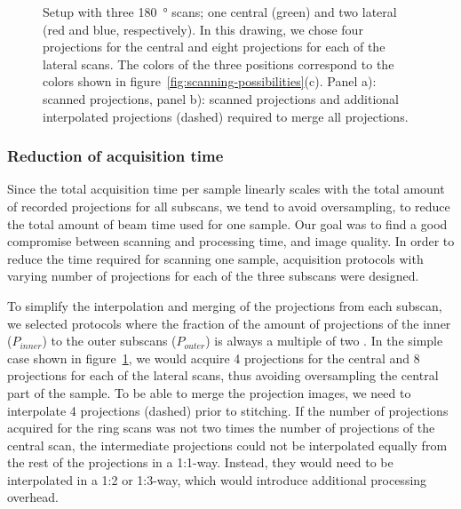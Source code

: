 \ifiucr
	\begin{figure}%
		\caption{Setup with three \SI{180}{\degree} scans; one central (green) and two lateral (red and blue, respectively). In this drawing, we chose four projections for the central and eight projections for each of the lateral scans. The colors of the three positions correspond to the colors shown in figure~\ref{fig:scanning-possibilities}(c). Panel a): scanned projections, panel b): scanned projections and additional interpolated projections (dashed) required to merge all projections.}%
		\label{fig:projections}%
	\end{figure}%
\else
	\begin{figure*}[htp]
		\centering
		\caption{Setup with three \SI{180}{\degree} scans; one central (green) and two lateral (red and blue, respectively). In this drawing, we chose four projections for the central and eight projections for each of the lateral scans. The colors of the three positions correspond to the colors shown in figure~\ref{fig:scanning-possibilities}(c). Panel a): scanned projections, panel b): scanned projections and additional interpolated projections (dashed) required to merge all projections.}%
		\label{fig:projections}
	\end{figure*}
\fi

\subsubsection{Reduction of acquisition time}\label{subsubsec:reduction-of-acquisition-time}%
Since the total acquisition time per sample linearly scales with the total amount of recorded projections for all subscans, we tend to avoid oversampling, to reduce the total amount of beam time used for one sample. Our goal was to find a good compromise between scanning and processing time, and image quality. In order to reduce the time required for scanning one sample, acquisition protocols with varying number of projections for each of the three subscans were designed.

To simplify the interpolation and merging of the projections from each subscan, we selected protocols where the fraction of the amount of projections of the inner ($P_{inner}$) to the outer subscans ($P_{outer}$) is always a multiple of two%
. In the simple case shown in figure~\ref{fig:projections}, we would acquire 4 projections for the central and 8 projections for each of the lateral scans, thus avoiding oversampling the central part of the sample. To be able to merge the projection images, we need to interpolate 4 projections (dashed) prior to stitching. If the number of projections acquired for the ring scans was not two times the number of projections of the central scan, the intermediate projections could not be interpolated equally from the rest of the projections in a 1:1-way. Instead, they would need to be interpolated in a 1:2 or 1:3-way, which would introduce additional processing overhead.

